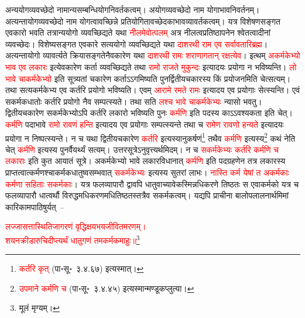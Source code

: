 \begin{sloppypar}
अन्य\-योग\-व्यवच्छेदो नामान्य\-सम्बन्धि\-योग\-निवर्तकत्वम्। अयोग\-व्यवच्छेदो नाम योगाभाव\-निवर्तनम्। अत्यन्तायोग\-व्यवच्छेदो नाम योगत्वावच्छिन्ने प्रतियोगितावच्छेदकाभाव\-व्यावर्तकत्वम्। यत्र विशेषण\-सङ्गत एवकारो भवति तत्रान्य\-योगो व्यवच्छिद्यते यथा \textcolor{red}{नीलमेवोत्पलम्‌} अत्र नीलत्व\-प्रतिष्ठापनेन श्वेतत्वादीनां व्यवच्छेदः। विशेष्य\-सङ्गत एव\-कारे सत्ययोगो व्यवच्छिद्यते यथा \textcolor{red}{दाशरथी राम एव सर्वावतारि\-ब्रह्म}। अत्यन्तायोगो व्यावर्त्यते क्रिया\-सङ्गतेनैव\-कारेण यथा \textcolor{red}{दाशरथी रामः शराणागतान् रक्षत्येव}। इत्थम् \textcolor{red}{अकर्मकेभ्यो भाव एव लकारः} इत्येव\-कारेण कर्ता व्यवच्छिद्यते तथा \textcolor{red}{रामो राजते मुकुन्दः} इत्यादयः प्रयोगा न भविष्यन्ति। \textcolor{red}{लो भावे चाकर्मकेभ्यो} इति सूत्र्यतां चकारेण कर्ताऽऽगमिष्यति पुनर्द्वितीय\-चकारस्य किं प्रयोजनमिति चेत्सत्यम्। तथा सत्यकर्मकेभ्य एव कर्तरि प्रयोगो भविष्यति। एवम् \textcolor{red}{आरामे रमते रामः} इत्यादय एव प्रयोगाः सेत्स्यन्ति। एवं सकर्मक\-धातोः कर्तरि प्रयोगो नैव सम्पत्स्यते। तथा सति \textcolor{red}{लश्च भावे चाकर्मकेभ्यः} न्यासो भवतु। द्वितीय\-चकारेण सकर्मकेभ्योऽपि कर्तरि लकारो भविष्यति पुनः \textcolor{red}{कर्मणि} इति पदस्य काऽऽवश्यकता इति चेत्। \textcolor{red}{कर्मणि} पदाभावे \textcolor{red}{रामो रावणं हन्ति} इत्यादय एव प्रयोगाः सम्पत्स्यन्ते तथा च \textcolor{red}{रामेण रावणो हन्यते} इत्यादयः प्रयोगा न निष्पत्स्यन्ते। न च यथा द्वितीय\-चकारेण \textcolor{red}{कर्तरि} इत्यस्यानुकर्षणं\footnote{\textcolor{red}{कर्तरि कृत्‌} (पा॰सू॰~३.४.६७) इत्यस्मात्।} तथैव \textcolor{red}{कर्मणि} इत्यस्य\footnote{\textcolor{red}{उपमाने कर्मणि च} (पा॰सू॰~३.४.४५) इत्यस्मान्मण्डूकप्लुत्या।} कथं नेति चेत् \textcolor{red}{कर्मणि} इत्यस्य पुनर्वैयर्थ्यं सत्यम्। उत्तर\-सूत्रेऽनुवृत्त्यर्थमिदम्। न च \textcolor{red}{सकर्मकेभ्यः कर्तरि कर्मणि च लकाराः} इति कुत आयातं सूत्रे। अकर्मकेभ्यो भावे लकारविधानात् \textcolor{red}{कर्मणि} इति पद\-ग्रहणेन तत्र लकारस्य प्राप्तत्वात्कर्मणश्चाकर्मक\-धातुष्वसम्भवात् \textcolor{red}{सकर्मकेभ्यः} इत्यस्य सुतरां लाभः। \textcolor{red}{नास्ति कर्म येषां त अकर्मकाः कर्मणा सहिताः सकर्मकाः}। यत्र फलव्यापारौ द्वावपि धातु\-वाच्यावेकस्मिन्नधिकरणे तिष्ठतः स एवाकर्मको यत्र च फल\-व्यापारौ धात्वर्थौ विरुद्धमधिकरणमधि\-तिष्ठतस्तत्रैव सकर्मकत्वम्। यद्यपि प्राचीना बालोपलालनार्थमिमां कारिकामपाठिषुर्यत्~–\end{sloppypar}
\centering\textcolor{red}{लज्जासत्तास्थितिजागरणं वृद्धिक्षयभयजीवितमरणम्।\nopagebreak\\
शयनक्रीडारुचिदीप्त्यर्थं धातुगणं तमकर्मकमाहुः॥}\footnote{मूलं मृग्यम्।}\\
